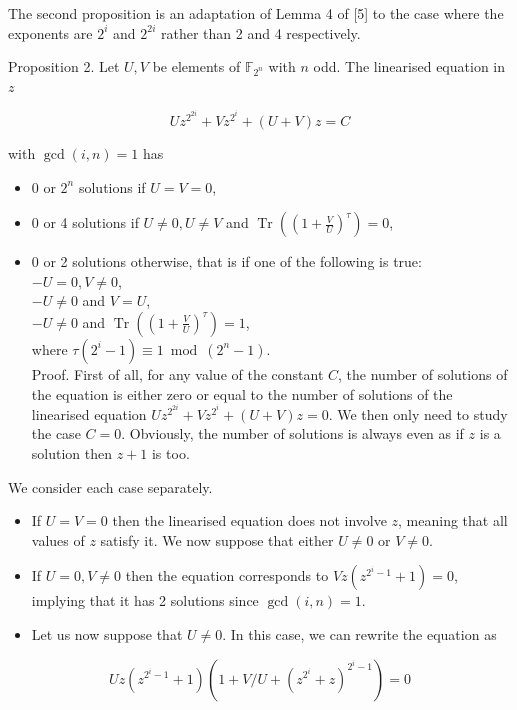 \documentclass[10pt]{article}
\begin{document}
The second proposition is an adaptation of Lemma 4 of [5] to the case where the exponents are $2^{i}$ and $2^{2 i}$ rather than 2 and 4 respectively.

Proposition 2. Let $U, V$ be elements of $\mathbb{F}_{2^{n}}$ with $n$ odd. The linearised equation in $z$

$$
U z^{2^{2 i}}+V z^{2^{i}}+(U+V) z=C
$$

with $\operatorname{gcd}(i, n)=1$ has

\begin{itemize}
  \item 0 or $2^{n}$ solutions if $U=V=0$,
  \item 0 or 4 solutions if $U \neq 0, U \neq V$ and $\operatorname{Tr}\left(\left(1+\frac{V}{U}\right)^{\tau}\right)=0$,
  \item 0 or 2 solutions otherwise, that is if one of the following is true:\\
$-U=0, V \neq 0$,\\
$-U \neq 0$ and $V=U$,\\
$-U \neq 0$ and $\operatorname{Tr}\left(\left(1+\frac{V}{U}\right)^{\tau}\right)=1$,\\
where $\tau\left(2^{i}-1\right) \equiv 1 \bmod \left(2^{n}-1\right)$.\\
Proof. First of all, for any value of the constant $C$, the number of solutions of the equation is either zero or equal to the number of solutions of the linearised equation $U z^{2^{2 i}}+V z^{2^{i}}+(U+V) z=0$. We then only need to study the case $C=0$. Obviously, the number of solutions is always even as if $z$ is a solution then $z+1$ is too.
\end{itemize}

We consider each case separately.

\begin{itemize}
  \item If $U=V=0$ then the linearised equation does not involve $z$, meaning that all values of $z$ satisfy it. We now suppose that either $U \neq 0$ or $V \neq 0$.
  \item If $U=0, V \neq 0$ then the equation corresponds to $V z\left(z^{2^{i}-1}+1\right)=0$, implying that it has 2 solutions since $\operatorname{gcd}(i, n)=1$.
  \item Let us now suppose that $U \neq 0$. In this case, we can rewrite the equation as
\end{itemize}

$$
U z\left(z^{2^{i}-1}+1\right)\left(1+V / U+\left(z^{2^{i}}+z\right)^{2^{i}-1}\right)=0
$$
\end{document}
